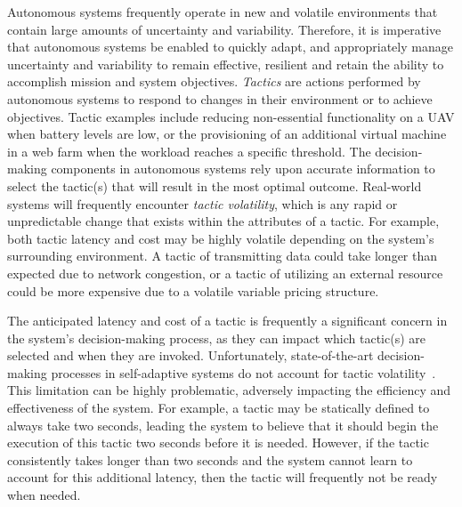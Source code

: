 Autonomous systems frequently operate in new and volatile environments that contain large amounts of uncertainty and variability. Therefore, it is imperative that autonomous systems be enabled to quickly adapt, and appropriately manage uncertainty and variability to remain effective, resilient and retain the ability to accomplish mission and system objectives. \emph{Tactics} are actions performed by autonomous systems to respond to changes in their environment or to achieve objectives. Tactic examples include reducing non-essential functionality on a UAV when battery levels are low, or the provisioning of an additional virtual machine in a web farm when the workload reaches a specific threshold. The decision-making components in autonomous systems rely upon accurate information to select the tactic(s) that will result in the most optimal outcome. Real-world systems will frequently encounter \emph{tactic volatility}, which is any rapid or unpredictable change that exists within the attributes of a tactic. For example, both tactic latency and cost may be highly volatile depending on the system's surrounding environment. A tactic of transmitting data could take longer than expected due to network congestion, or a tactic of utilizing an external resource could be more expensive due to a volatile variable pricing structure. 

The anticipated latency and cost of a tactic is frequently a significant concern in the system's decision-making process, as they can impact which tactic(s) are selected and when they are invoked. Unfortunately, state-of-the-art decision-making processes in self-adaptive systems do not account for tactic volatility~\cite{Krutz_ase_2019, moreno2017adaptation}. This limitation can be highly problematic, adversely impacting the efficiency and effectiveness of the system. For example, a tactic may be statically defined to always take two seconds, leading the system to believe that it should begin the execution of this tactic two seconds before it is needed. However, if the tactic consistently takes longer than two seconds and the system cannot learn to account for this additional latency, then the tactic will frequently not be ready when needed.





